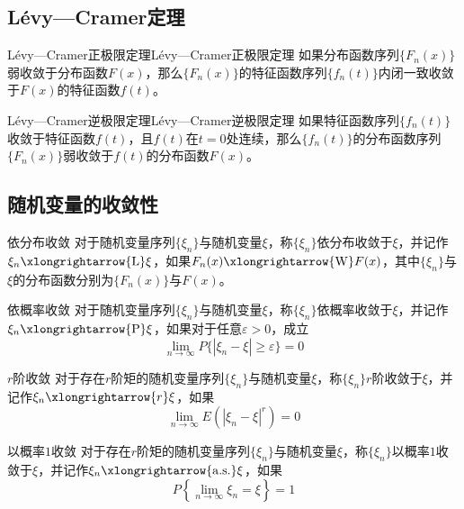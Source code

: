 \documentclass[lang = cn, scheme = chinese, thmcnt = section]{elegantbook}
\begin{document}
\subsection{Lévy—Cramer定理}

\begin{theorem}{Lévy—Cramer正极限定理}{Lévy—Cramer正极限定理}
	如果分布函数序列$\{F_n(x)\}$弱收敛于分布函数$F(x)$，那么$\{F_n(x)\}$的特征函数序列$\{f_n(t)\}$内闭一致收敛于$F(x)$的特征函数$f(t)$。
\end{theorem}

\begin{theorem}{Lévy—Cramer逆极限定理}{Lévy—Cramer逆极限定理}
	如果特征函数序列$\{f_n(t)\}$收敛于特征函数$f(t)$，且$f(t)$在$t=0$处连续，那么$\{f_n(t)\}$的分布函数序列$\{F_n(x)\}$弱收敛于$f(t)$的分布函数$F(x)$。
\end{theorem}

\subsection{随机变量的收敛性}

\begin{definition}{依分布收敛}
	对于随机变量序列$\{\xi_n\}$与随机变量$\xi$，称$\{\xi_n\}$依分布收敛于$\xi$，并记作$\xi_n\xlongrightarrow{\mathrm{L}}\xi$，如果$F_n(x)\xlongrightarrow{\mathrm{W}}F(x)$，其中$\{\xi_n\}$与$\xi$的分布函数分别为$\{F_n(x)\}$与$F(x)$。
\end{definition}

\begin{definition}{依概率收敛}
	对于随机变量序列$\{\xi_n\}$与随机变量$\xi$，称$\{\xi_n\}$依概率收敛于$\xi$，并记作$\xi_n\xlongrightarrow{\mathrm{P}}\xi$，如果对于任意$\varepsilon>0$，成立
	$$
	\lim_{n\to\infty}{P\{|\xi_n-\xi|\ge\varepsilon\}}=0
	$$
\end{definition}

\begin{definition}{$r$阶收敛}
	对于存在$r$阶矩的随机变量序列$\{\xi_n\}$与随机变量$\xi$，称$\{\xi_n\}$$r$阶收敛于$\xi$，并记作$\xi_n\xlongrightarrow{r}\xi$，如果
	$$
	\lim_{n\to\infty}E(|\xi_n-\xi|^r)=0
	$$
\end{definition}

\begin{definition}{以概率$1$收敛}
	对于存在$r$阶矩的随机变量序列$\{\xi_n\}$与随机变量$\xi$，称$\{\xi_n\}$以概率$1$收敛于$\xi$，并记作$\xi_n\xlongrightarrow{\mathrm{a.s.}}\xi$，如果
	$$
	P\left\{\lim_{n\to\infty}{\xi_n}=\xi\right\}=1
	$$
\end{definition}
\end{document}
